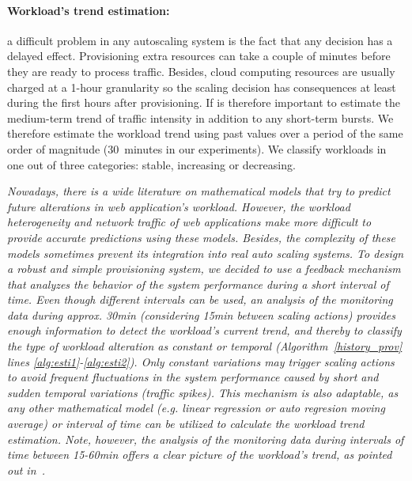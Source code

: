 
\paragraph{Workload's trend estimation:} 
a difficult problem in any autoscaling system is the fact that any
decision has a delayed effect. Provisioning extra resources can take a
couple of minutes before they are ready to process traffic. Besides,
cloud computing resources are usually charged at a 1-hour granularity
so the scaling decision has consequences at least during the first
hours after provisioning. If is therefore important to estimate the
medium-term trend of traffic intensity in addition to any short-term
bursts. We therefore estimate the workload trend using past values
over a period of the same order of magnitude (30\ minutes in our
experiments). We classify workloads in one out of three categories:
stable, increasing or decreasing.

\emph{Nowadays, there is a wide literature on mathematical models that try
to predict future alterations in web application's workload. However,
the workload heterogeneity and network traffic of web applications
make more difficult to provide accurate predictions using these
models. Besides, the complexity of these models sometimes prevent its
integration into real auto scaling systems. To design a robust and
simple provisioning system, we decided to use a feedback mechanism
that analyzes the behavior of the system performance during a short
interval of time. Even though different intervals can be used, an
analysis of the monitoring data during approx. 30min (considering
15min between scaling actions) provides enough information to detect
the workload's current trend, and thereby to classify the type of
workload alteration as \emph{constant} or \emph{temporal}
(Algorithm~\ref{history_prov}
lines \ref{alg:esti1}-\ref{alg:esti2}). Only \emph{constant}
variations may trigger scaling actions to avoid frequent fluctuations
in the system performance caused by short and sudden \emph{temporal}
variations (traffic spikes). This mechanism is also adaptable, as any
other mathematical model (e.g. linear regression or auto regresion
moving average) or interval of time can be utilized to calculate the
workload trend estimation. Note, however, the analysis of the
monitoring data during intervals of time between 15-60min offers a
clear picture of the workload's trend, as pointed out
in~\cite{gandhi_hybrid_2012}.}

